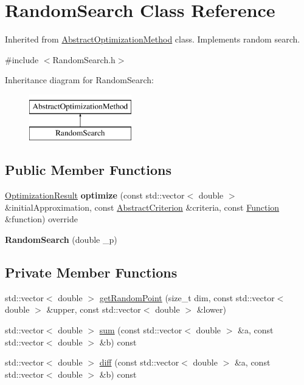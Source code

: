 \hypertarget{class_random_search}{}\section{Random\+Search Class Reference}
\label{class_random_search}


Inherited from \hyperlink{class_abstract_optimization_method}{Abstract\+Optimization\+Method} class. Implements random search.  




{\ttfamily \#include $<$Random\+Search.\+h$>$}

Inheritance diagram for Random\+Search\+:\begin{figure}[H]
\begin{center}
\leavevmode
\includegraphics[height=2.000000cm]{class_random_search}
\end{center}
\end{figure}
\subsection*{Public Member Functions}
\begin{DoxyCompactItemize}
\item 
\mbox{\label{class_random_search_aee62c84ae988d69fb05288f084415858}} 
\hyperlink{class_optimization_result}{Optimization\+Result} {\bfseries optimize} (const std\+::vector$<$ double $>$ \&initial\+Approximation, const \hyperlink{class_abstract_criterion}{Abstract\+Criterion} \&criteria, const \hyperlink{class_function}{Function} \&function) override
\item 
\mbox{\label{class_random_search_a9d45b60cbec1268dc9087ded7cb6b450}} 
{\bfseries Random\+Search} (double \+\_\+p)
\end{DoxyCompactItemize}
\subsection*{Private Member Functions}
\begin{DoxyCompactItemize}
\item 
std\+::vector$<$ double $>$ \hyperlink{class_random_search_a74de0911b029e12f9c02539362e39730}{get\+Random\+Point} (size\+\_\+t dim, const std\+::vector$<$ double $>$ \&upper, const std\+::vector$<$ double $>$ \&lower)
\item 
std\+::vector$<$ double $>$ \hyperlink{class_random_search_a06f28c1d7afc46a1c0382e6025e7ee4f}{sum} (const std\+::vector$<$ double $>$ \&a, const std\+::vector$<$ double $>$ \&b) const
\item 
std\+::vector$<$ double $>$ \hyperlink{class_random_search_a8a0a2518afe6d2ff29e8cb9d7b548edc}{diff} (const std\+::vector$<$ double $>$ \&a, const std\+::vector$<$ double $>$ \&b) const
\end{DoxyCompactItemize}
